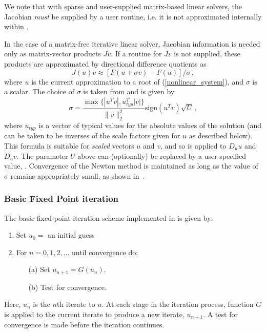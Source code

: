 We note that with sparse and user-supplied matrix-based linear
solvers, the Jacobian {\em must} be supplied by a user routine,
i.e. it is not approximated internally within {\kinsol}.

In the case of a matrix-free iterative linear solver, Jacobian
information is needed only as matrix-vector products $Jv$.  If a
routine for $Jv$ is not supplied, these products are approximated by
directional difference quotients as
\begin{equation}\label{e:JvDQ}
J(u) v \approx [F(u+\sigma v) - F(u)]/\sigma \, ,
\end{equation}
where $u$ is the current approximation to a root of
(\ref{nonlinear_system}), and $\sigma$ is a scalar. The choice of
$\sigma$ is taken from \cite{BrSa:90} and is given by
\begin{equation}\label{e:sigmaDQ_iterative}
  \sigma = \frac{\max \{|u^T v|, u^T_{typ} |v|\}}{\|v\|_2^2}
  \mbox{sign}(u^T v) \sqrt{U} \, ,
\end{equation}
where $u_{typ}$ is a vector of typical values for the absolute
values of the solution (and can be taken to be inverses of the
scale factors given for $u$ as described below).
This formula is suitable for {\it scaled} vectors $u$ and $v$, and
so is applied to $D_u u$ and $D_u v$.
The parameter $U$ above can (optionally) be replaced by a
user-specified value, .
Convergence of the Newton method is maintained as long as the
value of $\sigma$ remains appropriately small, as shown in~\cite{Bro:87}.


\subsubsection*{Basic Fixed Point iteration}
The basic fixed-point iteration scheme implemented in {\kinsol} is given by:

\vspace{1ex}
\begin{enumerate}
   \item Set $u_0 = $ an initial guess
   \item For $n = 0, 1, 2,...$ until convergence do:
      \begin{itemize}
          \item[(a)] Set $u_{n+1} = G(u_n)$.
          \item[(b)] Test for convergence.
      \end{itemize}
\end{enumerate}
Here, $u_n$ is the $n$th iterate to $u$.
At each stage in the iteration process, function $G$ is applied to the current
iterate to produce a new iterate, $u_{n+1}$.
A test for convergence is made before the iteration continues.


